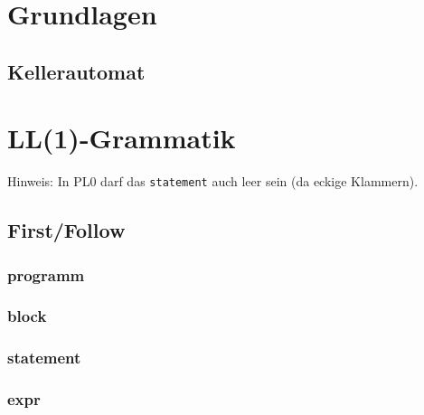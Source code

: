 \section{Grundlagen}
\subsection{Kellerautomat}

\section{LL(1)-Grammatik}
Hinweis: In PL0 darf das \lstinline`statement` auch leer sein (da eckige Klammern).
\subsection{First/Follow}
\subsubsection{programm}
\subsubsection{block}
\subsubsection{statement}
\subsubsection{expr}







